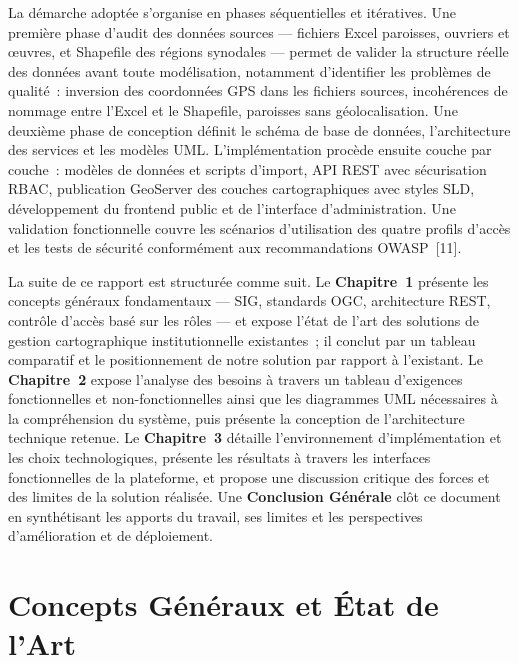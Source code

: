 \documentclass[12pt, a4paper]{report}
\begin{document}
La démarche adoptée s'organise en phases séquentielles et itératives. Une première
phase d'audit des données sources --- fichiers Excel paroisses, ouvriers et
œuvres, et Shapefile des régions synodales --- permet de valider la structure
réelle des données avant toute modélisation, notamment d'identifier les problèmes
de qualité~: inversion des coordonnées GPS dans les fichiers sources, incohérences
de nommage entre l'Excel et le Shapefile, paroisses sans géolocalisation. Une
deuxième phase de conception définit le schéma de base de données, l'architecture
des services et les modèles UML. L'implémentation procède ensuite couche par
couche~: modèles de données et scripts d'import, API REST avec sécurisation RBAC,
publication GeoServer des couches cartographiques avec styles SLD, développement
du frontend public et de l'interface d'administration. Une validation fonctionnelle
couvre les scénarios d'utilisation des quatre profils d'accès et les tests de
sécurité conformément aux recommandations OWASP~[11].

\medskip

La suite de ce rapport est structurée comme suit. Le \textbf{Chapitre~1} présente
les concepts généraux fondamentaux --- SIG, standards OGC, architecture REST,
contrôle d'accès basé sur les rôles --- et expose l'état de l'art des solutions
de gestion cartographique institutionnelle existantes~; il conclut par un tableau
comparatif et le positionnement de notre solution par rapport à l'existant. Le
\textbf{Chapitre~2} expose l'analyse des besoins à travers un tableau d'exigences
fonctionnelles et non-fonctionnelles ainsi que les diagrammes UML nécessaires à la
compréhension du système, puis présente la conception de l'architecture technique
retenue. Le \textbf{Chapitre~3} détaille l'environnement d'implémentation et les
choix technologiques, présente les résultats à travers les interfaces fonctionnelles
de la plateforme, et propose une discussion critique des forces et des limites de la
solution réalisée. Une \textbf{Conclusion Générale} clôt ce document en synthétisant
les apports du travail, ses limites et les perspectives d'amélioration et de
déploiement.

\clearpage

\chapter{Concepts Généraux et État de l'Art}
\end{document}
